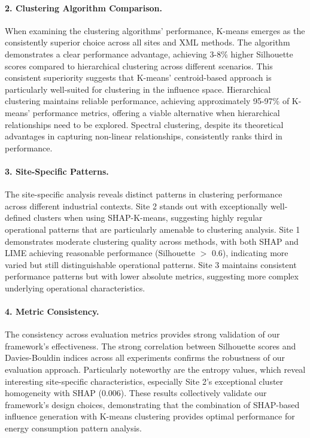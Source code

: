 \documentclass[final,5p,times,twocolumn,numbers]{elsarticle}
\begin{document}
\paragraph{2. Clustering Algorithm Comparison.}
When examining the clustering algorithms' performance, K-means emerges as the consistently superior choice across all sites and XML methods. The algorithm demonstrates a clear performance advantage, achieving 3-8\% higher Silhouette scores compared to hierarchical clustering across different scenarios. This consistent superiority suggests that K-means' centroid-based approach is particularly well-suited for clustering in the influence space. Hierarchical clustering maintains reliable performance, achieving approximately 95-97\% of K-means' performance metrics, offering a viable alternative when hierarchical relationships need to be explored. Spectral clustering, despite its theoretical advantages in capturing non-linear relationships, consistently ranks third in performance.

\paragraph{3. Site-Specific Patterns.}
The site-specific analysis reveals distinct patterns in clustering performance across different industrial contexts. Site 2 stands out with exceptionally well-defined clusters when using SHAP-K-means, suggesting highly regular operational patterns that are particularly amenable to clustering analysis. Site 1 demonstrates moderate clustering quality across methods, with both SHAP and LIME achieving reasonable performance (Silhouette $>$ 0.6), indicating more varied but still distinguishable operational patterns. Site 3 maintains consistent performance patterns but with lower absolute metrics, suggesting more complex underlying operational characteristics.

\paragraph{4. Metric Consistency.}
The consistency across evaluation metrics provides strong validation of our framework's effectiveness. The strong correlation between Silhouette scores and Davies-Bouldin indices across all experiments confirms the robustness of our evaluation approach. Particularly noteworthy are the entropy values, which reveal interesting site-specific characteristics, especially Site 2's exceptional cluster homogeneity with SHAP (0.006). These results collectively validate our framework's design choices, demonstrating that the combination of SHAP-based influence generation with K-means clustering provides optimal performance for energy consumption pattern analysis.
\end{document}
